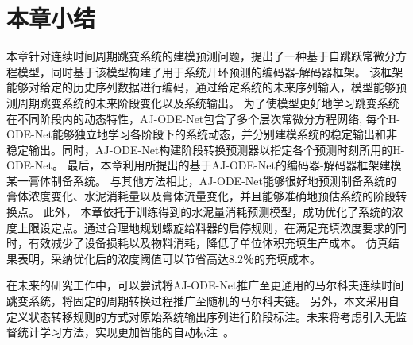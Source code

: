 \section{本章小结}
\label{sec:4_conclusion}
本章针对连续时间周期跳变系统的建模预测问题，提出了一种基于自跳跃常微分方程模型，同时基于该模型构建了用于系统开环预测的编码器-解码器框架。
该框架能够对给定的历史序列数据进行编码，通过给定系统的未来序列输入，模型能够预测周期跳变系统的未来阶段变化以及系统输出。
为了使模型更好地学习跳变系统在不同阶段内的动态特性，AJ-ODE-Net包含了多个层次常微分方程网络, 每个H-ODE-Net能够独立地学习各阶段下的系统动态，并分别建模系统的稳定输出和非稳定输出。同时，AJ-ODE-Net构建阶段转换预测器以指定各个预测时刻所用的H-ODE-Net。
最后，本章利用所提出的基于AJ-ODE-Net的编码器-解码器框架建模某一膏体制备系统。
与其他方法相比，AJ-ODE-Net能够很好地预测制备系统的膏体浓度变化、水泥消耗量以及膏体流量变化，并且能够准确地预估系统的阶段转换点。
此外，
本章依托于训练得到的水泥量消耗预测模型，成功优化了系统的浓度上限设定点。通过合理地规划螺旋给料器的启停规则，在满足充填浓度要求的同时，有效减少了设备损耗以及物料消耗，降低了单位体积充填生产成本。
仿真结果表明，采纳优化后的浓度阈值可以节省高达8.2％的充填成本。

在未来的研究工作中，可以尝试将AJ-ODE-Net推广至更通用的马尔科夫连续时间跳变系统，将固定的周期转换过程推广至随机的马尔科夫链。
另外，本文采用自定义状态转移规则的方式对原始系统输出序列进行阶段标注。未来将考虑引入无监督统计学习方法，实现更加智能的自动标注~\cite{10.1145/3097983.3098060}。






